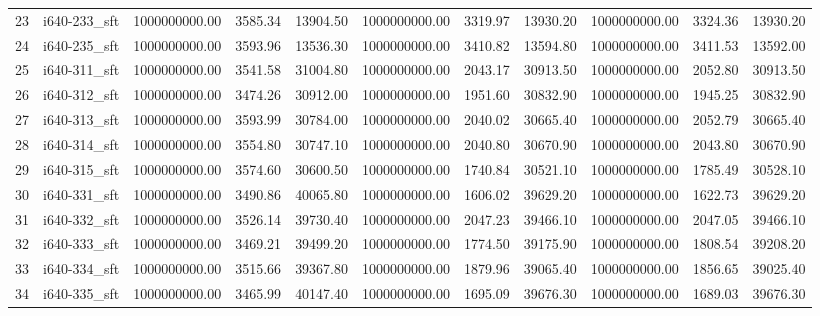 \begin{tabular}{llrrrrrrrrr}
23 &  i640-233\_sft &   1000000000.00 &             3585.34 &      13904.50 &   1000000000.00 &             3319.97 &      13930.20 & 1000000000.00 &           3324.36 &    13930.20 \\
24 &  i640-235\_sft &   1000000000.00 &             3593.96 &      13536.30 &   1000000000.00 &             3410.82 &      13594.80 & 1000000000.00 &           3411.53 &    13592.00 \\
25 &  i640-311\_sft &   1000000000.00 &             3541.58 &      31004.80 &   1000000000.00 &             2043.17 &      30913.50 & 1000000000.00 &           2052.80 &    30913.50 \\
26 &  i640-312\_sft &   1000000000.00 &             3474.26 &      30912.00 &   1000000000.00 &             1951.60 &      30832.90 & 1000000000.00 &           1945.25 &    30832.90 \\
27 &  i640-313\_sft &   1000000000.00 &             3593.99 &      30784.00 &   1000000000.00 &             2040.02 &      30665.40 & 1000000000.00 &           2052.79 &    30665.40 \\
28 &  i640-314\_sft &   1000000000.00 &             3554.80 &      30747.10 &   1000000000.00 &             2040.80 &      30670.90 & 1000000000.00 &           2043.80 &    30670.90 \\
29 &  i640-315\_sft &   1000000000.00 &             3574.60 &      30600.50 &   1000000000.00 &             1740.84 &      30521.10 & 1000000000.00 &           1785.49 &    30528.10 \\
30 &  i640-331\_sft &   1000000000.00 &             3490.86 &      40065.80 &   1000000000.00 &             1606.02 &      39629.20 & 1000000000.00 &           1622.73 &    39629.20 \\
31 &  i640-332\_sft &   1000000000.00 &             3526.14 &      39730.40 &   1000000000.00 &             2047.23 &      39466.10 & 1000000000.00 &           2047.05 &    39466.10 \\
32 &  i640-333\_sft &   1000000000.00 &             3469.21 &      39499.20 &   1000000000.00 &             1774.50 &      39175.90 & 1000000000.00 &           1808.54 &    39208.20 \\
33 &  i640-334\_sft &   1000000000.00 &             3515.66 &      39367.80 &   1000000000.00 &             1879.96 &      39065.40 & 1000000000.00 &           1856.65 &    39025.40 \\
34 &  i640-335\_sft &   1000000000.00 &             3465.99 &      40147.40 &   1000000000.00 &             1695.09 &      39676.30 & 1000000000.00 &           1689.03 &    39676.30 \\
\bottomrule
\end{tabular}
